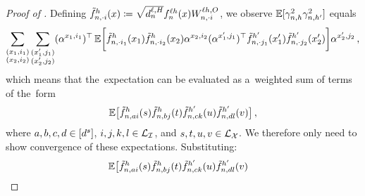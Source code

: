 \begin{proof}[Proof of ]
    Defining ${\tilde{f}}^{h}_{n, \cdot i}{(x)} \coloneqq \sqrt{d_{n}^{\ell, H}} {f}^{\ell h}_{n}{(x)} W_{n, \cdot i}^{\ell h, O}$, we observe $\operatorname*{\mathbb{E}} \lbrack  \gamma_{n , h}^2 \gamma_{n , h'}^2 \rbrack$ equals
    \begin{align*}
        \sum_{\substack{(x_1, i_1) \\ (x_2, i_2)}}
        \sum_{\substack{(x_1', j_1) \\ (x_2', j_2)}}
        (\alpha^{x_1, i_1})^\top
        \operatorname*{\mathbb{E}} \biggl[
            {\tilde{f}}^{h}_{n, \cdot i_1}{(x_1)}
            {\tilde{f}}^{h}_{n, \cdot i_2}{(x_2)}
            \alpha^{x_2, i_2}
            (\alpha^{x_1', j_1})^\top
            {\tilde{f}}^{h'}_{n, \cdot j_1}{(x_1')} 
            {\tilde{f}}^{h'}_{n, \cdot j_2}{(x_2')} 
        \biggr]
        \alpha^{x_2', j_2}
        \, ,
    \end{align*}
    which means that the~expectation can be evaluated as a~weighted sum of terms of the~form
    \begin{equation*}
        \operatorname*{\mathbb{E}} \bigl[
            {\tilde{f}}^{h}_{n, a i}{(s)}
            {\tilde{f}}^{h}_{n, b j}{(t)}
            {\tilde{f}}^{h'}_{n, c k}{(u)} 
            {\tilde{f}}^{h'}_{n, d l}{(v)} 
        \bigr]
        \, , 
    \end{equation*}
    where $a, b, c, d \in [d^s]$, $i, j, k, l \in \mathcal{L}_{\mathcal{I}}$, and $s, t, u, v \in \mathcal{L}_{\mathcal{X}}$.
    We therefore only need to show convergence of these expectations.
    Substituting:
    \begin{align*}
        \E \bigl[
            \tildeActivation{\headIndex}{\sequenceVariable, a i}{s}
            &
            \tildeActivation{\headIndex}{\sequenceVariable, b j}{t}
            \tildeActivation{\headIndex'}{\sequenceVariable, c k}{u} 
            \tildeActivation{\headIndex'}{\sequenceVariable, d l}{v} 

\end{align*}
\end{proof}
